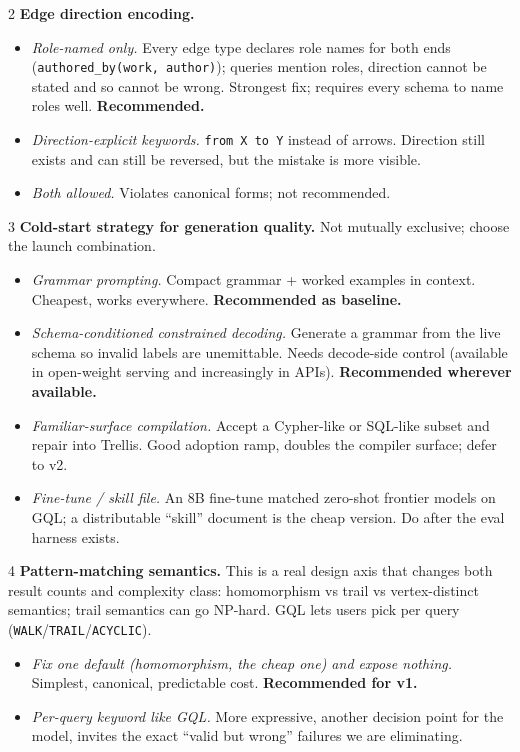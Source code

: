 \documentclass[11pt]{article}
\begin{document}
\begin{decisionbox}{2}
\textbf{Edge direction encoding.}
\begin{itemize}[leftmargin=1.4em,itemsep=1pt]
  \item[A.] \emph{Role-named only.} Every edge type declares role names for both ends (\texttt{authored\_by(work, author)}); queries mention roles, direction cannot be stated and so cannot be wrong. Strongest fix; requires every schema to name roles well. \textbf{Recommended.}
  \item[B.] \emph{Direction-explicit keywords.} \texttt{from X to Y} instead of arrows. Direction still exists and can still be reversed, but the mistake is more visible.
  \item[C.] \emph{Both allowed.} Violates canonical forms; not recommended.
\end{itemize}
\end{decisionbox}

\begin{decisionbox}{3}
\textbf{Cold-start strategy for generation quality.} Not mutually exclusive; choose the launch combination.
\begin{itemize}[leftmargin=1.4em,itemsep=1pt]
  \item[A.] \emph{Grammar prompting.} Compact grammar + worked examples in context. Cheapest, works everywhere. \textbf{Recommended as baseline.}
  \item[B.] \emph{Schema-conditioned constrained decoding.} Generate a grammar from the live schema so invalid labels are unemittable. Needs decode-side control (available in open-weight serving and increasingly in APIs). \textbf{Recommended wherever available.}
  \item[C.] \emph{Familiar-surface compilation.} Accept a Cypher-like or SQL-like subset and repair into Trellis. Good adoption ramp, doubles the compiler surface; defer to v2.
  \item[D.] \emph{Fine-tune / skill file.} An 8B fine-tune matched zero-shot frontier models on GQL; a distributable ``skill'' document is the cheap version. Do after the eval harness exists.
\end{itemize}
\end{decisionbox}

\begin{decisionbox}{4}
\textbf{Pattern-matching semantics.} This is a real design axis that changes both result counts and complexity class: homomorphism vs trail vs vertex-distinct semantics; trail semantics can go NP-hard. GQL lets users pick per query (\texttt{WALK}/\texttt{TRAIL}/\texttt{ACYCLIC}).
\begin{itemize}[leftmargin=1.4em,itemsep=1pt]
  \item[A.] \emph{Fix one default (homomorphism, the cheap one) and expose nothing.} Simplest, canonical, predictable cost. \textbf{Recommended for v1.}
  \item[B.] \emph{Per-query keyword like GQL.} More expressive, another decision point for the model, invites the exact ``valid but wrong'' failures we are eliminating.
\end{itemize}
\end{decisionbox}
\end{document}
